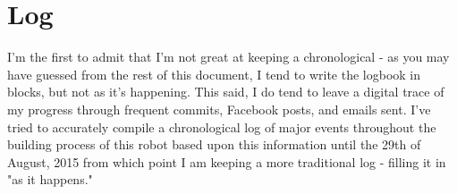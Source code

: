 \part{Log}
    I'm the first to admit that I'm not great at keeping a chronological  - as you may have guessed from the rest of this document, I tend to write the logbook in blocks, but not as it's happening. This said, I do tend to leave a digital trace of my progress through frequent  commits, Facebook posts, and emails sent. I've tried to accurately compile a chronological log of major events throughout the building process of this robot based upon this information until the 29th of August, 2015 from which point I am keeping a more traditional log - filling it in "as it happens."\\
    
    
    
    
